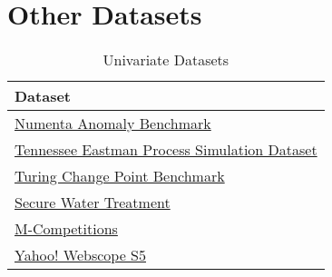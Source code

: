 \section{Other Datasets}
\begin{table}[h]\centering
        \begin{tabular}{l}
            Dataset                                                                                                                             \\\midrule
            \href{https://github.com/numenta/NAB}{Numenta Anomaly Benchmark}                                                                    \\\addlinespace
            \href{https://www.kaggle.com/averkij/tennessee-eastman-process-simulation-dataset}{Tennessee Eastman Process Simulation Dataset}    \\\addlinespace
            \href{https://github.com/alan-turing-institute/TCPDBench}{Turing Change Point Benchmark}                                            \\\addlinespace
            \href{https://itrust.sutd.edu.sg/testbeds/secure-water-treatment-swat/}{Secure Water Treatment}                                     \\\addlinespace
            \href{https://en.wikipedia.org/wiki/Makridakis\_Competitions}{M-Competitions}                                                       \\\addlinespace
            \href{https://webscope.sandbox.yahoo.com/catalog.php?datatype=s\&did=70}{Yahoo! Webscope S5}                                        \\
        \end{tabular}
    \caption{Univariate Datasets}\label{tab:univariate-datasets}
\end{table}

